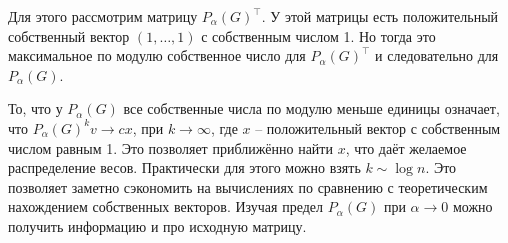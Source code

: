 \documentclass[10pt,a4paper,oneside]{book}
\theoremstyle{definition}
\begin{document}
Для этого рассмотрим матрицу $P_{\alpha}(G)^{\top}$. У этой матрицы есть положительный собственный вектор $(1,\dots,1)$ с собственным числом 1. Но тогда это максимальное по модулю собственное число для $P_{\alpha}(G)^{\top}$ и следовательно для $P_{\alpha}(G)$. 

То, что у $P_{\alpha}(G)$ все собственные числа по модулю меньше единицы означает, что $P_{\alpha}(G)^kv \to cx$, при $k \to \infty$, где $x$ -- положительный вектор с собственным числом равным 1. Это позволяет приближённо найти $x$, что даёт желаемое распределение весов. Практически для этого можно взять $k\sim \log n$. Это позволяет заметно сэкономить на вычислениях по сравнению с теоретическим нахождением собственных векторов. Изучая предел $P_{\alpha}(G)$ при $\alpha \to 0$ можно получить информацию и про исходную матрицу.




\end{document}
